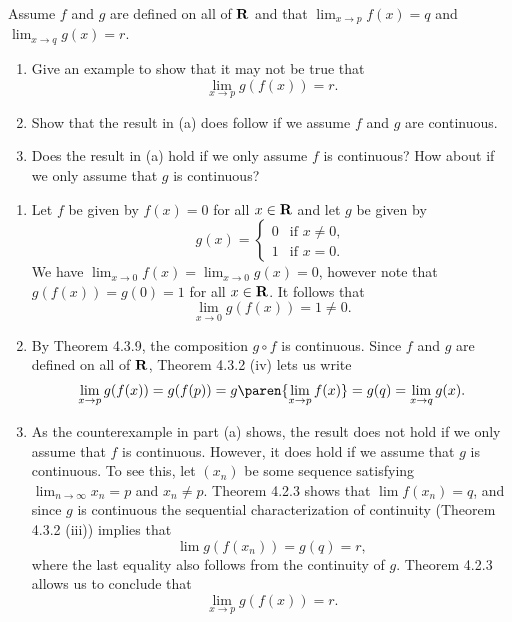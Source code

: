 \documentclass{lew98_solutions}
\begin{document}
\begin{exercise}
\label{ex:4.3.4}
    Assume \( f \) and \( g \) are defined on all of \( \mathbf{R} \) and that \( \lim_{x \to p} f(x) = q \) and \( \lim_{x \to q} g(x) = r \).
    \begin{enumerate}
        \item Give an example to show that it may not be true that
        \[
            \lim_{x \to p} g(f(x)) = r.
        \]

        \item Show that the result in (a) does follow if we assume \( f \) and \( g \) are continuous.

        \item Does the result in (a) hold if we only assume \( f \) is continuous? How about if we only assume that \( g \) is continuous?
    \end{enumerate}
\end{exercise}

\begin{solution}
    \begin{enumerate}
        \item Let \( f \) be given by \( f(x) = 0 \) for all \( x \in \mathbf{R} \) and let \( g \) be given by
        \[
            g(x) = \begin{cases}
                0 & \text{if } x \neq 0, \\
                1 & \text{if } x = 0.
            \end{cases}
        \]
        We have \( \lim_{x \to 0} f(x) = \lim_{x \to 0} g(x) = 0 \), however note that \( g(f(x)) = g(0) = 1 \) for all \( x \in \mathbf{R} \). It follows that
        \[
            \lim_{x \to 0} g(f(x)) = 1 \neq 0.
        \]

        \item By Theorem 4.3.9, the composition \( g \circ f \) is continuous. Since \( f \) and \( g \) are defined on all of \( \mathbf{R} \), Theorem 4.3.2 (iv) lets us write
        \[
            \lim_{x \to p} g(f(x)) = g(f(p)) = g \paren{ \lim_{x \to p} f(x) } = g(q) = \lim_{x \to q} g(x).
        \]

        \item As the counterexample in part (a) shows, the result does not hold if we only assume that \( f \) is continuous. However, it does hold if we assume that \( g \) is continuous. To see this, let \( (x_n) \) be some sequence satisfying \( \lim_{n \to \infty} x_n = p \) and \( x_n \neq p \). Theorem 4.2.3 shows that \( \lim f(x_n) = q \), and since \( g \) is continuous the sequential characterization of continuity (Theorem 4.3.2 (iii)) implies that
        \[
            \lim g(f(x_n)) = g(q) = r,
        \]
        where the last equality also follows from the continuity of \( g \). Theorem 4.2.3 allows us to conclude that
        \[
            \lim_{x \to p} g(f(x)) = r.
        \]
    \end{enumerate}
\end{solution}
\end{document}

